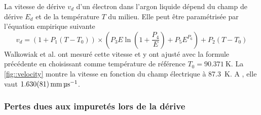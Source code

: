         La vitesse de dérive $v_d$ d'un électron dans l'argon liquide dépend du champ de dérive $E_d$ et de la température $T$ du milieu. Elle peut être paramétrisée par l'équation empirique suivante\cite{Gonidec1996}
        \begin{equation}\label{eq::velocity}
          v_d = \left(1+P_1(T-T_0)\right)\times\left(P_3E\ln\left(1+\frac{P_4}{E}\right)+P_5E^{P_6}\right) + P_2(T-T_0)
        \end{equation}
        Walkowiak et al.\cite{Walkowiak2000} ont mesuré cette vitesse et y ont ajusté avec la formule précédente en choisissant comme température de référence $T_0=\SI{90.371}{\kelvin}$.%
        La \autoref{fig::velocity} montre la vitesse en fonction du champ électrique à \SI{87.3}{\kelvin}. A \driftfield{}, elle vaut $\SI{1.63\pm0.081}{\milli\meter\per\micro\second}$.

      \subsubsection{Pertes dues aux impuretés lors de la dérive}\label{sec::purity}
        
